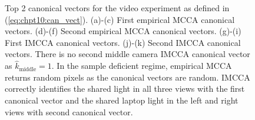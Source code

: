 \begin{figure}
\begin{center}
{    }
    \hspace{27ex}
    \caption{Top 2 canonical vectors for the video experiment as defined in
      (\ref{eq:chpt10:can_vect}). (a)-(c) First empirical MCCA canonical vectors. (d)-(f)
      Second empirical MCCA canonical vectors. (g)-(i) First IMCCA canonical
      vectors. (j)-(k) Second IMCCA canonical vectors. There is no second middle camera
      IMCCA canonical vector as $\widehat{k}_{\text{middle}}=1$. In the
      sample deficient regime, empirical MCCA returns random pixels as the canonical
      vectors are random. IMCCA correctly identifies the shared light in all three views
      with the first canonical vector and the shared laptop light in the left and right
      views with second canonical vector.}
    \label{fig:chpt10:mcca_cca_vects}
  \end{center}
\end{figure}

